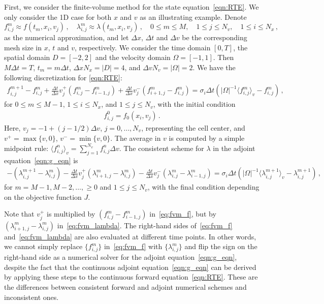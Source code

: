 \documentclass[12pt]{amsart}
\newcommand{\dt}{\Delta t}
\newcommand{\dx}{\Delta x}
\newcommand{\dv}{\Delta v}
\newcommand{\fij}{f_{i,j}}
\newcommand{\fijm}{f_{i-1,j}}
\newcommand{\fijp}{f_{i+1,j}}
\newcommand{\gij}{\lambda_{i,j}}
\newcommand{\gijm}{\lambda_{i-1,j}}
\newcommand{\gijp}{\lambda_{i+1,j}}
\newcommand{\np}{{m+1}}
\newcommand{\average}[1]{ \langle#1 \rangle}
\begin{document}
First, we consider the finite-volume method for the state equation~\eqref{eqn:RTE}. We only consider the 1D case for both $x$ and $v$ as an illustrating example. Denote
\[
\fij^m \approx f(t_m, x_i, v_j)\,,\quad  \gij^m \approx \lambda(t_m, x_i, v_j)\,, \quad 0\leq m \leq M, \quad 1\leq j \leq N_v,\quad 1\leq i \leq N_x\,,
\]
as the numerical approximation, and let  $\dx$, $\dt$ and  $\dv $ be the corresponding mesh size in $x$, $t$ and $v$, respectively. We consider the time domain $[0,T]$, the spatial domain $D = [-2,2]$ and the velocity domain $\Omega = [-1,1]$. Then $M \dt = T$,  $t_m = m \dt$,  $\dx N_x = |D| = 4$,  and $\dv N_v = |\Omega| = 2$. We have the following discretization for \eqref{eqn:RTE}:
\begin{align}\label{eq:fvm_f}
    \fij^\np - \fij^m + \frac{\dt}{\dx} v_j^{+}(\fij^m - \fijm^m) 
    + \frac{\dt}{\dx} v_j^{-}(\fijp^m - \fij^m) = \sigma_i \dt \left(|\Omega|^{-1}\average{\fij^m}_v - \fij^m \right)
    \,,
\end{align}
for $0\leq m \leq M -1$, $1\leq i \leq N_x$,  and $1\leq j \leq N_v$, 
with the initial condition 
\begin{align*}
    \fij^0 = f_0(x_i, v_j)\,.
\end{align*}
Here, $v_j = -1+ (j-1/2) \dv$, $j = 0,\ldots, N_v$, representing the cell center, and $v^+ = \max\{v,0\}$, $v^- = \min\{v,0\}$. The average in $v$ is computed by a simple midpoint rule: $\average{\fij^n}_v = \sum_{j=1}^{N_v} \fij^n \dv$.  The consistent scheme for $\lambda$ in the adjoint equation~\eqref{eqn:g_eqn} is
\begin{align}\label{eq:fvm_lambda}
     - (\gij^\np - \gij^m ) - \frac{\dt}{\dx} v_j^{+}(\gijp^m - \gij^m ) 
    - \frac{\dt}{\dx} v_j^{-}( \gij^m - \gijm^m ) = \sigma_i \dt (|\Omega|^{-1}\average{\gij^\np}_v - \gij^\np)
    \,,
\end{align}
for $m = M-1, M-2, \ldots, \geq 0$ and $1\leq j \leq N_v$, with the final condition depending on the objective function $J$.

Note that $v_j^+$ is multiplied by $(\fij^m - \fijm^m)$ in~\eqref{eq:fvm_f}, but by $(\gijp^m - \gij^m )$ in~\eqref{eq:fvm_lambda}. The right-hand sides of~\eqref{eq:fvm_f} and~\eqref{eq:fvm_lambda} are also evaluated at different time points.  In other words, we cannot simply replace $\{\fij^m\}$  in~\eqref{eq:fvm_f}
 with $\{\gij^m\}$ and flip the sign on the right-hand side as a numerical solver for the adjoint equation~\eqref{eqn:g_eqn}, despite the fact that the continuous adjoint equation~\eqref{eqn:g_eqn} can be derived by applying these steps to the continuous forward equation~\eqref{eqn:RTE}.  These are the differences between consistent forward and adjoint numerical schemes and inconsistent ones.
 
\end{document}
